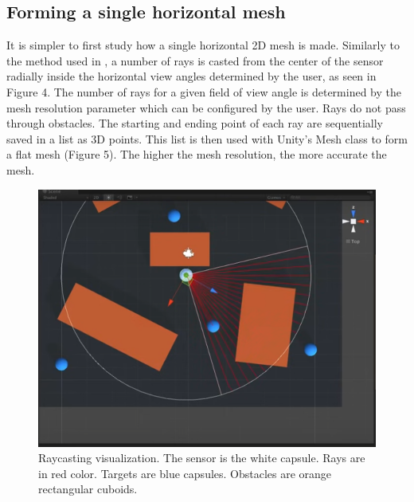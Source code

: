 \documentclass{article}
\begin{document}
\subsection{Forming a single horizontal mesh}
    
    It is simpler to first study how a single horizontal 2D mesh is made. Similarly to the method used in \cite{sebastian_lague_field_2015}, a number of rays is casted from the center of the sensor radially inside the horizontal view angles determined by the user, as seen in Figure 4. The number of rays for a given field of view angle is determined by the mesh resolution parameter which can be configured by the user. Rays do not pass through obstacles. The starting and ending point of each ray are sequentially saved in a list as 3D points. This list is then used with Unity's Mesh class to form a flat mesh (Figure 5). The higher the mesh resolution, the more accurate the mesh. 
    
\begin{figure} %
	\centering
	\includegraphics[width=1\columnwidth]{FOV(5).png} %
	\caption{Raycasting visualization. The sensor is the white capsule. Rays are in red color. Targets are blue capsules. Obstacles are orange rectangular cuboids.}
\end{figure}
\end{document}
